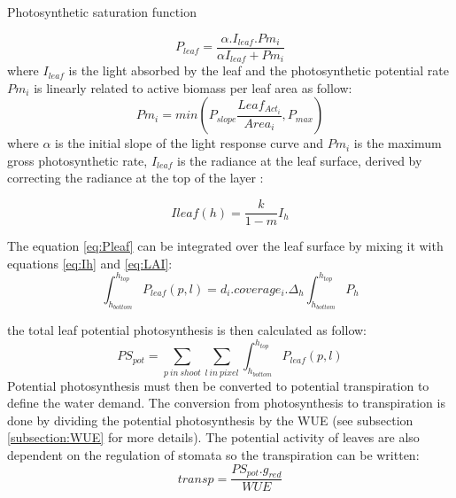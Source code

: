 \documentclass[a4paper,twoside, justified,marginals=raggedright]{tufte-handout}
\begin{document}
\begin{marginfigure}
\label{fig:derivaives}
\caption{Photosynthetic saturation function}
\end{marginfigure}

\begin{equation}\label{eq:Pleaf}
P_{leaf} = \frac{\alpha. I_{leaf}.Pm_{i}}{\alpha I_{leaf}+Pm_{i}}
\end{equation}
 where $I_{leaf}$ is the light absorbed by the leaf and the photosynthetic potential rate $Pm_{i}$ is linearly related to active biomass per leaf area as follow:
\begin{equation}
Pm_{i} = min(P_{slope} \frac{Leaf_{Act_{i}}}{Area_{i}}, P_{max})
\end{equation}
where $\alpha$ is the initial slope of the light response curve and $Pm_{i}$ is the maximum gross photosynthetic rate, $I_{leaf}$ is the radiance at the leaf surface, derived by correcting the radiance at the top of the layer :

\begin{equation}
I{leaf}(h) = \frac{k}{1-m}I_{h}
\end{equation}

The equation \eqref{eq:Pleaf} can be integrated over the leaf surface by mixing it with equations \eqref{eq:Ih} and \eqref{eq:LAI}:
\begin{equation}\label{Ppixlay}
\int_{h_{bottom}}^{h_{top}}P_{leaf}(p,l) = d_{i}.coverage_{i}.\Delta_{h}\int_{h_{bottom}}^{h_{top}}P_{h}
\end{equation}
%

the total leaf potential photosynthesis is then calculated as follow:
\begin{equation}\label{eq:PS_pot}
PS_{pot} = \sum_{p\ in\ shoot}\sum_{l\ in\ pixel}\int_{h_{bottom}}^{h_{top}}P_{leaf}(p,l)
\end{equation}
\indent Potential photosynthesis must then be converted to potential transpiration to define the water demand. The conversion from photosynthesis to transpiration is done by dividing the potential photosynthesis by the WUE (see subsection \ref{subsection:WUE} for more details). The potential activity of leaves are also dependent on the regulation of stomata so the transpiration can be written:
\begin{equation}
transp = \frac{PS_{pot} . g_{red}}{WUE}
\end{equation}
\end{document}
